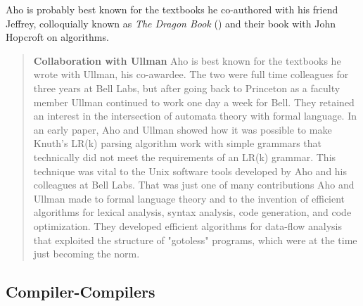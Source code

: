 Aho is probably best known for the textbooks he co-authored with his friend Jeffrey,
colloquially known as \textit{The Dragon Book} ()
and their book with John Hopcroft on algorithms.

\begin{quotation}
	\textbf{Collaboration with Ullman}
	Aho is best known for the textbooks he wrote with Ullman, his co-awardee.
	The two were full time colleagues for three years at Bell Labs, but after
	going back to Princeton as a faculty member Ullman continued to work one day a
	week for Bell. They retained an interest in the intersection of automata theory
	with formal language. In an early paper, Aho and Ullman showed how it was
	possible to make Knuth's LR(k) parsing algorithm work with simple grammars that
	technically did not meet the requirements of an LR(k) grammar. This technique
	was vital to the Unix software tools developed by Aho and his colleagues at Bell
	Labs. That was just one of many contributions Aho and Ullman made to formal
	language theory and to the invention of efficient algorithms for lexical
	analysis, syntax analysis, code generation, and code optimization. They
	developed efficient algorithms for data-flow analysis that exploited the
	structure of "gotoless" programs, which were at the time just becoming the norm.
	\cite{aho_turing_award_2020}
\end{quotation}

\subsection{Compiler-Compilers}




